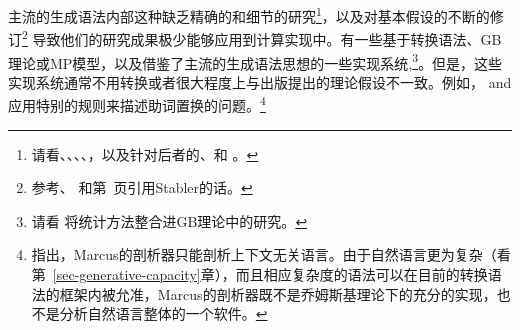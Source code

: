 主流的生成语法内部这种缺乏精确的和细节的研究\footnote{
	请看\eg {}、、、、，以及针对后者的、和
   。 
}，以及对基本假设的不断的修订\footnote{
	参考\eg {}、 和第~\pageref{Zitat-Stabler}页引用Stabler的话。
} 导致他们的研究成果极少能够应用到计算实现中。有一些基于转换语法、GB理论或MP模型，以及借鉴了主流的生成语法思想的一些实现系统\citep*{Petrick65a-u,ZFHW65a,Kay67a,Friedman69a,FBDPM71a-u,Morin73a-u,Marcus80a-u,AC86a,Kuhns86a,Correra87a,Stabler87a,Stabler92a-u,Stabler2001a,KT91a,Fong91a-u,CL92a,Lohnstein93a-u,FC94a,Nordgard94a,Veenstra98a,%
FG2012a%
},\footnote{
  请看  将统计方法整合进GB理论中的研究。
}。但是，这些实现系统通常不用转换或者很大程度上与出版提出的理论假设不一致。例如，\citet[--104]{Marcus80a-u} and
\citet[]{Stabler87a} 应用特别的规则来描述助词置换的问题。\footnote{
  \citet{NF86a-u,NF87a-u} 指出，Marcus的剖析器只能剖析上下文无关语言。由于自然语言更为复杂（看第~\ref{sec-generative-capacity}章），而且相应复杂度的语法可以在目前的转换语法的框架内被允准，Marcus的剖析器既不是乔姆斯基理论下的充分的实现，也不是分析自然语言整体的一个软件。
}
